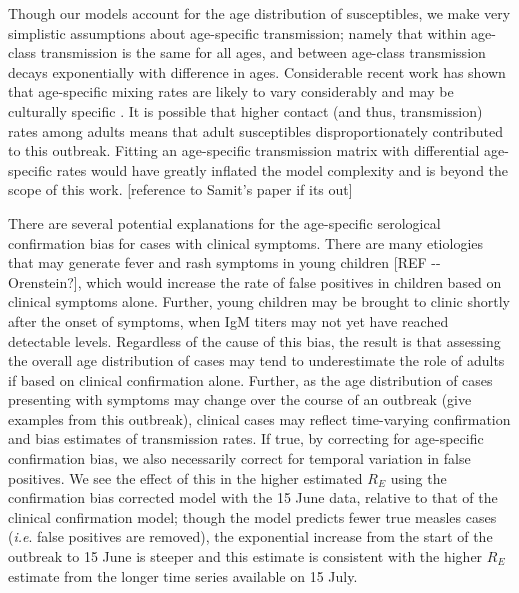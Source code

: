 Though our models account for the age distribution of susceptibles, we make very simplistic assumptions about age-specific transmission; namely that
within age-class transmission is the same for all ages, and between age-class transmission decays exponentially with difference in ages. Considerable recent work has shown that age-specific mixing rates are likely to vary considerably and may be culturally specific \cite{Mossong_2008}. It is possible that higher contact (and thus, transmission) rates among adults means that adult susceptibles disproportionately contributed to this outbreak. Fitting an age-specific transmission matrix with differential age-specific rates would have greatly inflated the model complexity and is beyond the scope of this work. {[}reference to Samit's paper if its out{]}

There are several potential explanations for the age-specific serological confirmation bias for cases with clinical symptoms. There are many
etiologies that may generate fever and rash symptoms in young children {[}REF -\/- Orenstein?{]}, which would increase the rate of false
positives in children based on clinical symptoms alone. Further, young children may be brought to clinic shortly after the onset of symptoms,
when IgM titers may not yet have reached detectable levels. Regardless of the cause of this bias, the result is that assessing the
overall age distribution of cases may tend to underestimate the role of adults if based on clinical confirmation alone. Further, as the age
distribution of cases presenting with symptoms may change over the course of an outbreak (give examples from this outbreak), clinical cases
may reflect time-varying confirmation and bias estimates of transmission rates. If true, by correcting for age-specific confirmation bias, we also
necessarily correct for temporal variation in false positives. We see the effect of this in the higher estimated \(R_E\) using the confirmation
bias corrected model with the 15 June data, relative to that of the clinical confirmation model; though the model predicts fewer true measles cases (\emph{i.e}. false positives are removed), the exponential increase from the start of the outbreak to 15 June is steeper and this estimate is consistent with the higher \(R_E\) estimate from the longer time series available on 15 July.


